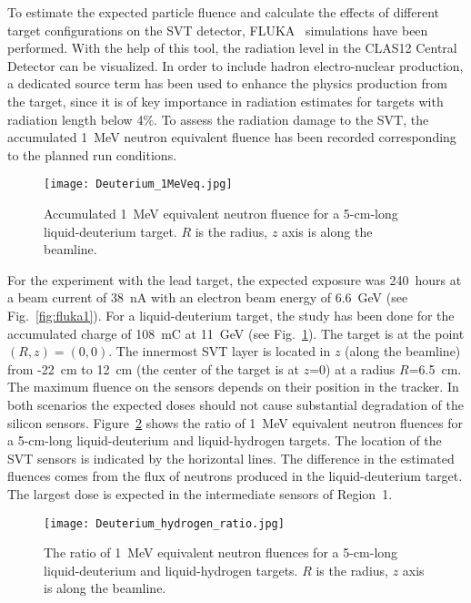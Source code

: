 To estimate the expected particle fluence and calculate the effects of different target configurations on the SVT
detector,  FLUKA~\cite{FLUKA1, FLUKA2} simulations have been performed. With the help of this tool, the
radiation level in the CLAS12 Central Detector can be visualized. In order to include hadron electro-nuclear
production, a dedicated source term has been used to enhance the physics production from the target, since it is
of key importance in radiation estimates for targets with radiation length below 4$\%$. To assess the radiation
damage to the SVT, the accumulated 1~MeV neutron equivalent fluence has been recorded corresponding to the
planned run conditions. 

\begin{figure}[hbt] 
\texttt{[image: Deuterium\_1MeVeq.jpg]}
\caption{Accumulated 1~MeV equivalent neutron fluence for a 5-cm-long liquid-deuterium target. $R$ is the radius,
  $z$ axis is along the beamline.}
\label{fig:fluka2}
\end{figure}

For the experiment with the lead target, the expected exposure was 240~hours at a beam current of 38~nA with
an electron beam energy of 6.6~GeV (see Fig.~\ref{fig:fluka1}). For a liquid-deuterium target, the study has been
done for the accumulated charge of 108~mC at 11~GeV (see Fig.~\ref{fig:fluka2}). The target is at the point
$(R,z)=(0, 0)$. The innermost SVT layer is located in $z$ (along the beamline) from -22~cm to 12~cm (the center of
the target is at $z$=0) at a radius $R$=6.5~cm. The maximum fluence on the sensors depends on their position in the
tracker. In both scenarios the expected doses should not cause substantial degradation of the silicon sensors.
Figure~\ref{fig:fluka3} shows the ratio of 1~MeV equivalent neutron fluences for a 5-cm-long liquid-deuterium and
liquid-hydrogen targets. The location of the SVT sensors is indicated by the horizontal lines. The difference in the
estimated fluences comes from the flux of neutrons produced in the liquid-deuterium target. The largest dose is
expected in the intermediate sensors of Region~1.

\begin{figure}[hbt] 
\texttt{[image: Deuterium\_hydrogen\_ratio.jpg]}
\caption{The ratio of 1~MeV equivalent neutron fluences for a 5-cm-long liquid-deuterium and liquid-hydrogen
  targets. $R$ is the radius, $z$ axis is along the beamline.}
\label{fig:fluka3}
\end{figure}

